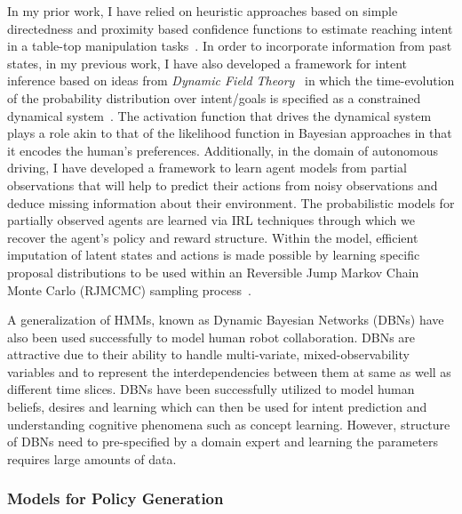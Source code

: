\documentclass[12pt]{article}
\begin{document}
In my prior work, I have relied on heuristic approaches based on simple directedness and proximity based confidence functions to estimate reaching intent in a table-top manipulation tasks~\cite{gopinath2017human}. In order to incorporate information from past states, in my previous work, I have also developed a framework for intent inference based on ideas from \textit{Dynamic Field Theory}~\cite{schoner1995dynamics} in which the time-evolution of the probability distribution over intent/goals is specified as a constrained dynamical system~\cite{gopinathdynamic}. The activation function that drives the dynamical system plays a role akin to that of the likelihood function in Bayesian approaches in that it encodes the human's preferences. Additionally, in the domain of autonomous driving, I have developed a framework to learn agent models from partial observations that will help to predict their actions from noisy observations and deduce missing information about their environment. The probabilistic models for partially observed agents are learned via IRL techniques through which we recover the agent's policy and reward structure. Within the model, efficient imputation of latent states and actions is made possible by learning specific proposal distributions\cite{gu2015neural} to be used within an Reversible Jump Markov Chain Monte Carlo (RJMCMC) sampling process~\cite{green1995reversible}. 

A generalization of HMMs, known as Dynamic Bayesian Networks (DBNs) have also been used successfully to model human robot collaboration. DBNs are attractive due to their ability to handle multi-variate, mixed-observability variables and to represent the interdependencies between them at same as well as different time slices\cite{murphy2002dynamic}. DBNs have been successfully utilized to model human beliefs, desires and learning which can then be used for intent prediction and understanding cognitive phenomena such as concept learning\cite{tahboub2006intelligent}. However, structure of DBNs need to pre-specified by a domain expert and learning the parameters requires large amounts of data. 

\subsubsection{Models for Policy Generation}
\end{document}
